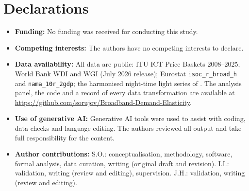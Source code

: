 \documentclass[pdflatex,sn-basic]{sn-jnl}
\newif\ifblind
\begin{document}
\section*{Declarations}

\begin{itemize}
\item \textbf{Funding:} No funding was received for conducting this study.
\item \textbf{Competing interests:} The authors have no competing interests to declare.
\item \textbf{Data availability:} All data are public: ITU ICT Price Baskets 2008--2025; World Bank WDI and WGI (July 2026 release); Eurostat \texttt{isoc\_r\_broad\_h} and \texttt{nama\_10r\_2gdp}; the harmonised night-time light series of \citet{li2020harmonized}. The analysis panel, the code and a record of every data transformation are available \ifblind from the authors on request\else at \url{https://github.com/sorujov/Broadband-Demand-Elasticity}\fi.
\item \textbf{Use of generative AI:} Generative AI tools were used to assist with coding, data checks and language editing. The authors reviewed all output and take full responsibility for the content.
\ifblind\else
\item \textbf{Author contributions:} S.O.: conceptualisation, methodology, software, formal analysis, data curation, writing (original draft and revision). I.I.: validation, writing (review and editing), supervision. J.H.: validation, writing (review and editing).
\fi
\end{itemize}


\end{document}
